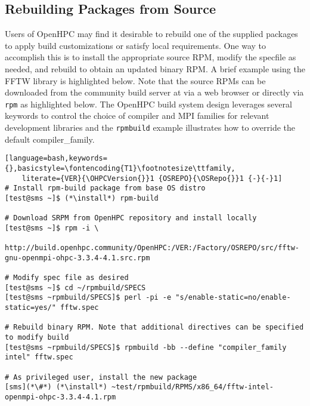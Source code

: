\subsection{Rebuilding Packages from Source}  \label{appendix:rpmbuild}

Users of OpenHPC may find it desirable to rebuild one of the supplied packages
to apply build customizations or satisfy local requirements. One way to
accomplish this is to install the appropriate source RPM, modify the specfile
as needed, and rebuild to obtain an updated binary RPM. A brief example using
the FFTW library is highlighted below.  Note that the source RPMs can be downloaded from the
community build server at \href{https://build.openhpc.community}
{\color{blue}{https://build.openhpc.community}} via a web browser or directly
via \texttt{rpm} as highlighted below. The OpenHPC build system design
leverages several keywords to control the choice of compiler and MPI families
for relevant development libraries and the \texttt{rpmbuild} example
illustrates how to override the default compiler\_family.

\begin{lstlisting}[language=bash,keywords={},basicstyle=\fontencoding{T1}\footnotesize\ttfamily,
    literate={VER}{\OHPCVersion{}}1 {OSREPO}{\OSRepo{}}1 {-}{-}1]
# Install rpm-build package from base OS distro
[test@sms ~]$ (*\install*) rpm-build

# Download SRPM from OpenHPC repository and install locally
[test@sms ~]$ rpm -i \
  http://build.openhpc.community/OpenHPC:/VER:/Factory/OSREPO/src/fftw-gnu-openmpi-ohpc-3.3.4-4.1.src.rpm

# Modify spec file as desired
[test@sms ~]$ cd ~/rpmbuild/SPECS
[test@sms ~rpmbuild/SPECS]$ perl -pi -e "s/enable-static=no/enable-static=yes/" fftw.spec

# Rebuild binary RPM. Note that additional directives can be specified to modify build
[test@sms ~rpmbuild/SPECS]$ rpmbuild -bb --define "compiler_family intel" fftw.spec

# As privileged user, install the new package
[sms](*\#*) (*\install*) ~test/rpmbuild/RPMS/x86_64/fftw-intel-openmpi-ohpc-3.3.4-4.1.rpm
\end{lstlisting}
